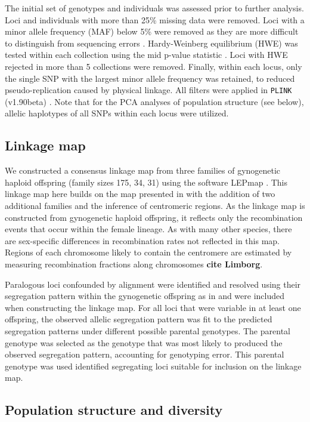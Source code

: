\documentclass[12pt, one column]{article}
\begin{document}
The initial set of genotypes and individuals was assessed prior to further analysis.  Loci and individuals with more than 25\% missing data were removed.  Loci with a minor allele frequency (MAF) below 5\% were removed as they are more difficult to distinguish from sequencing errors \citep{Nielsen2011} . Hardy-Weinberg equilibrium (HWE) was tested within each collection using the mid p-value statistic \citep{Graffelman2013}. Loci with HWE rejected in more than 5 collections were removed.  Finally, within each locus, only the single SNP with the largest minor allele frequency was retained, to reduced pseudo-replication caused by physical linkage.  All filters were applied in \texttt{PLINK} (v1.90beta) \citep{Chang2014}. Note that for the PCA analyses of population structure (see below), allelic haplotypes of all SNPs within each locus were utilized.

\subsection*{Linkage map}
We constructed a consensus linkage map from three families of gynogenetic haploid offspring (family sizes 175, 34, 31) using the software LEPmap \citep{Rastas2013}. This linkage map here builds on the map presented in \citet{Waples2015} with the addition of two additional families and the inference of centromeric regions. As the linkage map is constructed from gynogenetic haploid offspring, it reflects only the recombination events that occur within the female lineage. As with many other species, there are sex-specific differences in recombination rates not reflected in this map. Regions of each chromosome likely to contain the centromere are estimated by measuring recombination fractions along chromosomes \textbf{cite Limborg}.

Paralogous loci confounded by alignment were identified and resolved using their segregation pattern within the gynogenetic offspring as in \citet{Waples2015} and were included when constructing the linkage map. For all loci that were variable in at least one offspring, the observed allelic segregation pattern was fit to the predicted segregation patterns under different possible parental genotypes.  The parental genotype was selected as the genotype that was most likely to produced the observed segregation pattern, accounting for genotyping error. This parental genotype was used identified segregating loci suitable for inclusion on the linkage map. 

\subsection*{Population structure and diversity}
\end{document}
